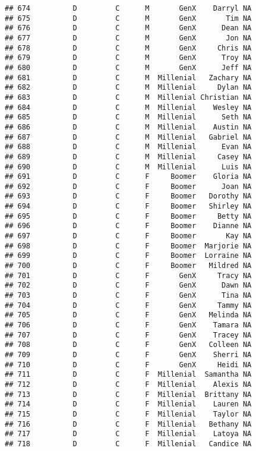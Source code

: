 \documentclass[
]{article}
\begin{document}
\begin{verbatim}
## 674          D         C      M       GenX    Darryl NA
## 675          D         C      M       GenX       Tim NA
## 676          D         C      M       GenX      Dean NA
## 677          D         C      M       GenX       Jon NA
## 678          D         C      M       GenX     Chris NA
## 679          D         C      M       GenX      Troy NA
## 680          D         C      M       GenX      Jeff NA
## 681          D         C      M  Millenial   Zachary NA
## 682          D         C      M  Millenial     Dylan NA
## 683          D         C      M  Millenial Christian NA
## 684          D         C      M  Millenial    Wesley NA
## 685          D         C      M  Millenial      Seth NA
## 686          D         C      M  Millenial    Austin NA
## 687          D         C      M  Millenial   Gabriel NA
## 688          D         C      M  Millenial      Evan NA
## 689          D         C      M  Millenial     Casey NA
## 690          D         C      M  Millenial      Luis NA
## 691          D         C      F     Boomer    Gloria NA
## 692          D         C      F     Boomer      Joan NA
## 693          D         C      F     Boomer   Dorothy NA
## 694          D         C      F     Boomer   Shirley NA
## 695          D         C      F     Boomer     Betty NA
## 696          D         C      F     Boomer    Dianne NA
## 697          D         C      F     Boomer       Kay NA
## 698          D         C      F     Boomer  Marjorie NA
## 699          D         C      F     Boomer  Lorraine NA
## 700          D         C      F     Boomer   Mildred NA
## 701          D         C      F       GenX     Tracy NA
## 702          D         C      F       GenX      Dawn NA
## 703          D         C      F       GenX      Tina NA
## 704          D         C      F       GenX     Tammy NA
## 705          D         C      F       GenX   Melinda NA
## 706          D         C      F       GenX    Tamara NA
## 707          D         C      F       GenX    Tracey NA
## 708          D         C      F       GenX   Colleen NA
## 709          D         C      F       GenX    Sherri NA
## 710          D         C      F       GenX     Heidi NA
## 711          D         C      F  Millenial  Samantha NA
## 712          D         C      F  Millenial    Alexis NA
## 713          D         C      F  Millenial  Brittany NA
## 714          D         C      F  Millenial    Lauren NA
## 715          D         C      F  Millenial    Taylor NA
## 716          D         C      F  Millenial   Bethany NA
## 717          D         C      F  Millenial    Latoya NA
## 718          D         C      F  Millenial   Candice NA

\end{verbatim}
\end{document}
